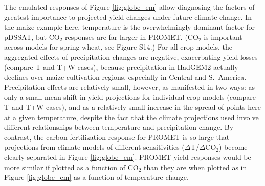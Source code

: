 \documentclass[gmdd]{copernicus} %
\begin{document}

The emulated responses of Figure \ref{fig:globe_em} allow diagnosing the factors of greatest importance to projected yield changes under future climate change. In the maize example here, temperature is the overwhelmingly dominant factor for pDSSAT, but CO$_2$ responses are far larger in PROMET. (CO$_2$ is important across models for spring wheat, see Figure S14.) For all crop models, the aggregated effects of precipitation changes are negative, exacerbating yield losses (compare T and T+W cases), because precipitation in HadGEM2 actually declines over maize cultivation regions, especially in Central and S.\ America. Precipitation effects are relatively small, however, as manifested in two ways: as only a small mean shift in yield projections for individual crop models (compare T and T+W cases), and as a relatively small increase in the spread of points here at a given temperature, despite the fact that the climate projections used involve different relationships between temperature and precipitation change.  By contrast, the carbon fertilization response for PROMET is so large that projections from climate models of different sensitivities ($\Delta$T/$\Delta$CO$_2$) become clearly separated in Figure \ref{fig:globe_em}. PROMET yield responses would be more similar if plotted as a function of CO$_2$ than they are when plotted as in Figure \ref{fig:globe_em} as a function of temperature change. 
\end{document}
